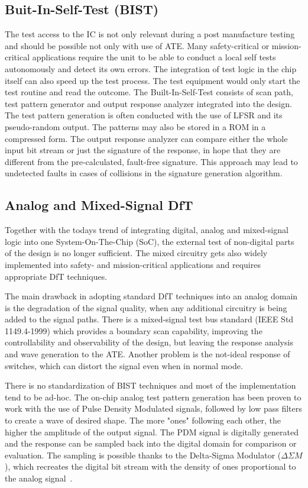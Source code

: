 \subsection{Buit-In-Self-Test (BIST)}
The test access to the IC is not only relevant during a post manufacture testing and should be possible not only with use of ATE. Many safety-critical or mission-critical applications require the unit to be able to conduct a local self tests autonomously and detect its own errors. The integration of test logic in the chip itself can also speed up the test process. The test equipment would only start the test routine and read the outcome. The Built-In-Self-Test consists of scan path, test pattern generator and output response analyzer integrated into the design. The test pattern generation is often conducted with the use of LFSR and its pseudo-random output. The patterns may also be stored in a ROM in a compressed form. The output response analyzer can compare either the whole input bit stream or just the signature of the response, in hope that they are different from the pre-calculated, fault-free signature. This approach may lead to undetected faults in cases of collisions in the signature generation algorithm.

\subsection{Analog and Mixed-Signal DfT}\label{sub:testa}
Together with the todays trend of integrating digital, analog and mixed-signal logic into one System-On-The-Chip (SoC), the external test of non-digital parts of the design is no longer sufficient. The mixed circuitry gets also widely implemented into safety- and mission-critical applications and requires appropriate DfT techniques.

The main drawback in adopting standard DfT techniques into an analog domain is the degradation of the signal quality, when any additional circuitry is being added to the signal paths. There is a mixed-signal test bus standard (IEEE Std 1149.4-1999) which provides a boundary scan capability, improving the controllability and observability of the design, but leaving the response analysis and wave generation to the ATE. Another problem is the not-ideal response of switches, which can distort the signal even when in normal mode.

There is no standardization of BIST techniques and most of the implementation tend to be ad-hoc. The on-chip analog test pattern generation has been proven to work with the use of Pulse Density Modulated signals, followed by low pass filters to create a wave of desired shape. The more "ones" following each other, the higher the amplitude of the output signal. The PDM signal is digitally generated and the response can be sampled back into the digital domain for comparison or evaluation. The sampling is possible thanks to the Delta-Sigma Modulator ($\Delta \Sigma M$), which recreates the digital bit stream with the density of ones proportional to the analog signal~\cite{book:Grout}.

